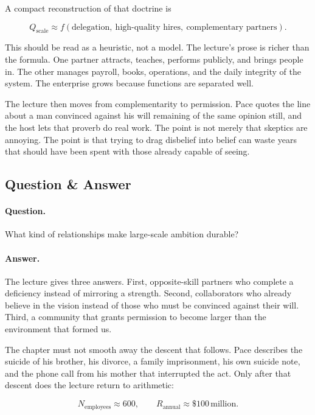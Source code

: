 A compact reconstruction of that doctrine is

\begin{equation}
Q_{\text{scale}}
\approx
f(\text{delegation},\ \text{high-quality hires},\ \text{complementary partners}).
\end{equation}

This should be read as a heuristic, not a model. The lecture's prose is richer than the formula. One partner attracts, teaches, performs publicly, and brings people in. The other manages payroll, books, operations, and the daily integrity of the system. The enterprise grows because functions are separated well.

The lecture then moves from complementarity to permission. Pace quotes the line about a man convinced against his will remaining of the same opinion still, and the host lets that proverb do real work. The point is not merely that skeptics are annoying. The point is that trying to drag disbelief into belief can waste years that should have been spent with those already capable of seeing.

\subsection{Question \& Answer}

\paragraph{Question.} What kind of relationships make large-scale ambition durable?

\paragraph{Answer.} The lecture gives three answers. First, opposite-skill partners who complete a deficiency instead of mirroring a strength. Second, collaborators who already believe in the vision instead of those who must be convinced against their will. Third, a community that grants permission to become larger than the environment that formed us.

The chapter must not smooth away the descent that follows. Pace describes the suicide of his brother, his divorce, a family imprisonment, his own suicide note, and the phone call from his mother that interrupted the act. Only after that descent does the lecture return to arithmetic:

\begin{equation}
N_{\text{employees}}\approx 600,
\qquad
R_{\text{annual}}\approx \$100\,\text{million}.
\end{equation}

